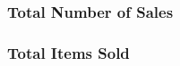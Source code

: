 \documentclass{article}
\begin{document}

            \subsubsection{Total Number of Sales}

            \subsubsection{Total Items Sold}
                
\end{document}
